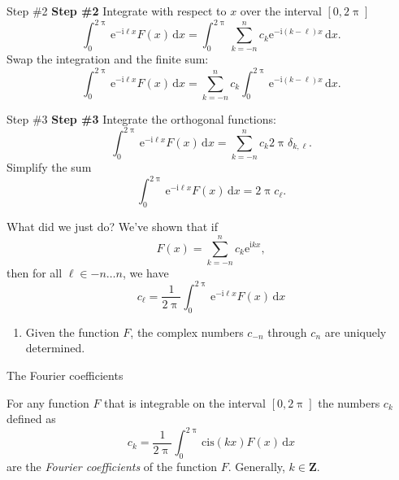 \documentclass[portrait,fleqn,12pt]{beamer}
\newcommand{\integers}{\mathbf{Z}}
\newcommand{\cis}{\mathrm{cis}}
\newcommand{\euler}{\mathrm{e}}
\newcommand{\imag}{\mathrm{i}}
\newenvironment{handlist}
   {\begin{enumerate}[\faHandPointRight]
       \addtolength{\itemsep}{0.0\itemsep}}
     {\end{enumerate}}
\begin{document}
\begin{frame}{Step \#2}
    \textbf{Step \#2} Integrate with respect to $x$ over the 
    interval $[0, 2 \uppi]$
    \begin{equation}
       \int_0^{2 \uppi} \euler^{-\imag  \ell x} F(x) \,
         \mathrm{d}x =  \int_0^{2 \uppi} \sum_{k=-n}^n c_k 
        \euler^{-\imag  (k - \ell) x} \,
        \mathrm{d}x.
 \end{equation}
 Swap the integration and the finite sum:
 \begin{equation}
       \int_0^{2 \uppi} \euler^{-\imag  \ell x} F(x) \,
         \mathrm{d}x =  \sum_{k=-n}^n c_k 
         \int_0^{2 \uppi}  \euler^{-\imag  (k - \ell) x} \,   \mathrm{d}x.
 \end{equation}
 \end{frame}
 
 \begin{frame}{Step \#3}
   \textbf{Step \#3} Integrate the orthogonal functions:
   \begin{equation}
       \int_0^{2 \uppi} \euler^{-\imag  \ell x} F(x) \,
         \mathrm{d}x =  \sum_{k=-n}^n c_k  2 \uppi \delta_{k, \ell} .
       \end{equation}
   Simplify the sum
   \begin{equation}
       \int_0^{2 \uppi} \euler^{-\imag  \ell x} F(x) \,
         \mathrm{d}x =   2 \uppi c_\ell.
       \end{equation}
  
 \end{frame}
 
 \begin{frame}{What did we just do?}
 We've shown that if 
 \begin{equation}
    F(x) = \sum_{k=-n}^n c_k \euler^{\imag  k x},
\end{equation}
then for all $\ell \in -n \dots n$, we have
\begin{equation}
   c_\ell = \frac{1}{2 \uppi} \int_0^{2 \uppi} \euler^{-\imag  \ell x} F(x) \, \mathrm{d}x
\end{equation}
\begin{handlist}
\item Given the function $F$, the complex numbers $c_{-n}$ through $c_n$ are uniquely determined.
\end{handlist}
 \end{frame}
 
 \begin{frame}{The Fourier coefficients}
 
 For any function $F$ that is integrable on the interval $[0,2 \uppi]$ the numbers $c_k$ defined as
 \begin{equation*}
   c_k = \frac{1}{2 \uppi} \int_0^{2 \uppi} \cis(k x) F(x) \, \mathrm{d} x
 \end{equation*}
 are the \emph{Fourier coefficients} of the function $F$.  Generally, $k \in \integers$.
 
 
 \end{frame}
 
\end{document}
